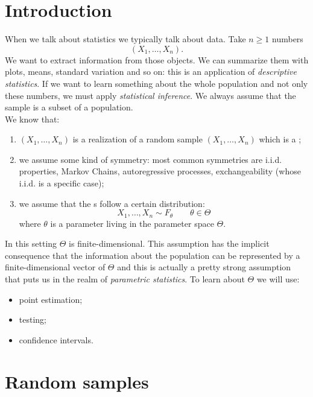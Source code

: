 \documentclass[12pt]{report}
\begin{document}
\section{Introduction}
When we talk about statistics we typically talk about data. Take $n\geq1$ numbers
\begin{equation*}
	(X_{1},\ldots,X_{n}).
\end{equation*}
We want to extract information from those objects. We can summarize them with plots, means, standard variation and so on: this is an application of \emph{descriptive statistics}. If we want to learn something about the whole population and not only these numbers, we must apply \emph{statistical inference}. We always assume that the sample is a subset of a population. \\
We know that:
\begin{enumerate}
	\item $(X_{1},\ldots,X_{n})$ is a realization of a random sample $(X_{1},\ldots,X_{n})$ which is a \rv;
	\item we assume some kind of symmetry: most common symmetries are i.i.d. properties, Markov Chains, autoregressive processes, exchangeability (whose i.i.d. is a specific case);
	\item we assume that the \rv s follow a certain distribution:
	\begin{equation*}
		X_{1},\ldots,X_{n}\sim F_{\theta}\qquad\theta\in\Theta
	\end{equation*}
	where $\theta$ is a parameter living in the parameter space $\Theta$.
\end{enumerate}
In this setting $\Theta$ is finite-dimensional. This assumption has the implicit consequence that the information about the population can be represented by a finite-dimensional vector of $\Theta$ and this is actually a pretty strong assumption that puts us in the realm of \emph{parametric statistics}. To learn about $\Theta$ we will use:
\begin{itemize}
	\item point estimation;
	\item testing;
	\item confidence intervals.
\end{itemize}
\section{Random samples}
\end{document}

